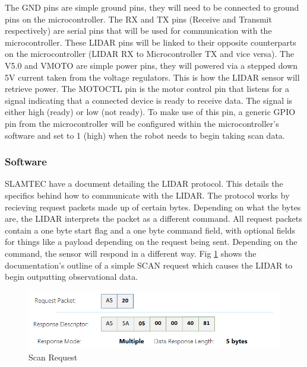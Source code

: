 				The GND pins are simple ground pins, they will need to be connected to ground pins on the microcontroller. The RX and TX pins (Receive and Transmit respectively) are serial pins that will be used for communication with the microcontroller. These LIDAR pins will be linked to their opposite counterparts on the microcontroller (LIDAR RX to Microcontroller TX and vice versa). The V5.0 and VMOTO are simple power pins, they will powered via a stepped down 5V current taken from the voltage regulators. This is how the LIDAR sensor will retrieve power. The MOTOCTL pin is the motor control pin that listens for a signal indicating that a connected device is ready to receive data. The signal is either high (ready) or low (not ready). To make use of this pin, a generic GPIO pin from the microcontroller will be configured within the microcontroller's software and set to 1 (high) when the robot needs to begin taking scan data.
				
				\subsubsection{Software}
				\label{sec:observation:software}
				SLAMTEC have a document detailing the LIDAR protocol\citep{rplidarprotocol}. This details the specifics behind how to communicate with the LIDAR. The protocol works by recieving request packets made up of certain bytes. Depending on what the bytes are, the LIDAR interprets the packet as a different command. All request packets contain a one byte start flag and a one byte command field, with optional fields for things like a payload depending on the request being sent. Depending on the command, the sensor will respond in a different way. Fig \ref{fig:examplerequest} shows the documentation's outline of a simple SCAN request which causes the LIDAR to begin outputting observational data.
				\begin{figure}[h]
					\centering
					\includegraphics[width=.9\linewidth]{SYNTHESIS/examplerequest.png}
					\caption{Scan Request}
					\label{fig:examplerequest}
				\end{figure}
			
